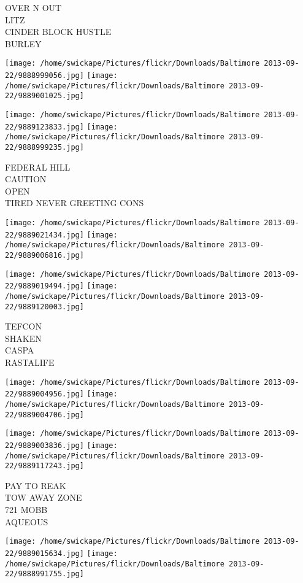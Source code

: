 \documentclass[10pt,letterpaper]{article}
\begin{document}
OVER N OUT\\
LITZ\\
CINDER BLOCK HUSTLE\\
BURLEY
\pagebreak

\texttt{[image: /home/swickape/Pictures/flickr/Downloads/Baltimore 2013-09-22/9888999056.jpg]}
\texttt{[image: /home/swickape/Pictures/flickr/Downloads/Baltimore 2013-09-22/9889001025.jpg]}

\texttt{[image: /home/swickape/Pictures/flickr/Downloads/Baltimore 2013-09-22/9889123833.jpg]}
\texttt{[image: /home/swickape/Pictures/flickr/Downloads/Baltimore 2013-09-22/9888999235.jpg]}

FEDERAL HILL\\
CAUTION\\
OPEN\\
TIRED NEVER GREETING CONS
\pagebreak

\texttt{[image: /home/swickape/Pictures/flickr/Downloads/Baltimore 2013-09-22/9889021434.jpg]}
\texttt{[image: /home/swickape/Pictures/flickr/Downloads/Baltimore 2013-09-22/9889006816.jpg]}

\texttt{[image: /home/swickape/Pictures/flickr/Downloads/Baltimore 2013-09-22/9889019494.jpg]}
\texttt{[image: /home/swickape/Pictures/flickr/Downloads/Baltimore 2013-09-22/9889120003.jpg]}

TEFCON\\
SHAKEN\\
CASPA\\
RASTALIFE
\pagebreak

\texttt{[image: /home/swickape/Pictures/flickr/Downloads/Baltimore 2013-09-22/9889004956.jpg]}
\texttt{[image: /home/swickape/Pictures/flickr/Downloads/Baltimore 2013-09-22/9889004706.jpg]}

\texttt{[image: /home/swickape/Pictures/flickr/Downloads/Baltimore 2013-09-22/9889003836.jpg]}
\texttt{[image: /home/swickape/Pictures/flickr/Downloads/Baltimore 2013-09-22/9889117243.jpg]}

PAY TO REAK\\
TOW AWAY ZONE\\
721 MOBB\\
AQUEOUS
\pagebreak

\texttt{[image: /home/swickape/Pictures/flickr/Downloads/Baltimore 2013-09-22/9889015634.jpg]}
\texttt{[image: /home/swickape/Pictures/flickr/Downloads/Baltimore 2013-09-22/9888991755.jpg]}
\end{document}
